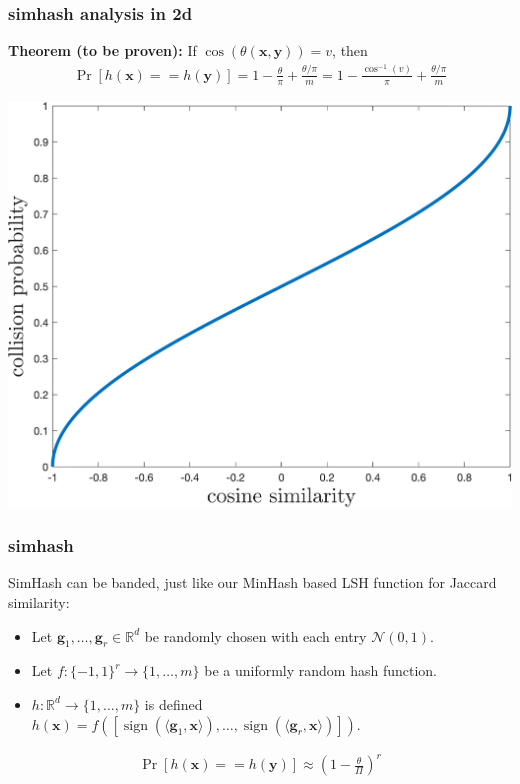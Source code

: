 \documentclass[compress]{beamer}
\newcommand{\bv}[1]{\mathbf{#1}}
\newcommand{\R}{\mathbb{R}}
\DeclareMathOperator{\sign}{sign}
\begin{document}
%		



\begin{frame}[t]
	\frametitle{simhash analysis in 2d}
	\textbf{Theorem (to be proven):} If $\cos(\theta(\bv{x},\bv{y})) = v$, then 
	\begin{align*}
		\Pr[h(\bv{x}) == h(\bv{y})] = 1 - \frac{\theta}{\pi}  + \frac{\theta/\pi}{m}= 1 - \frac{\cos^{-1}(v)}{\pi} + \frac{\theta/\pi}{m}
	\end{align*}
	\begin{center}
		\includegraphics[width=.6\textwidth]{cosine_sim.png}
	\end{center}
\end{frame}

\begin{frame}
	\frametitle{simhash}
	SimHash can be banded, just like our MinHash based LSH function for Jaccard similarity:
	\begin{itemize}
		\item Let $\bv{g}_1,\ldots, \bv{g}_r \in \R^d$ be randomly chosen with each entry $\mathcal{N}(0,1)$. 
		\item Let $f: \{-1,1\}^r \rightarrow \{1,\ldots, m\}$ be a uniformly random hash function. 
		\item $h: \R^d \rightarrow \{1,\ldots, m\}$ is defined $h(\bv{x}) = f\left([\sign(\langle \bv{g}_1, \bv{x} \rangle),\ldots, \sign(\langle \bv{g}_r, \bv{x} \rangle)]\right)$.
	\end{itemize}
\begin{align*}
	\Pr[h(\bv{x}) == h(\bv{y})] \approx \left(1-\frac{\theta}{\Pi}\right)^r
\end{align*}
\end{frame}
\end{document}
